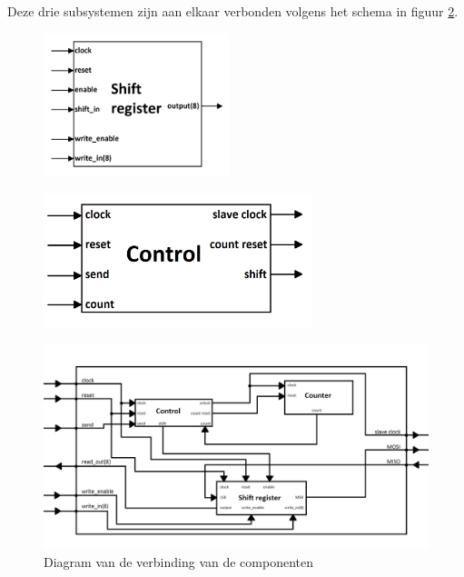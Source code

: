 \documentclass[oneside,dutch]{tudelft-report}
\begin{document}
Deze drie subsystemen zijn aan elkaar verbonden volgens het schema in figuur \ref{spi-system-diagram}.

\begin{figure}[H]
\centering
\begin{minipage}{.5\textwidth}
  \centering
  \includegraphics[width=5.4cm]{./shift_register_diagram}
  \label{shift-register-diagram}
\end{minipage}%
\begin{minipage}{.5\textwidth}
  \centering
  \includegraphics[width=7.8cm]{./control_diagram}
  \label{control-diagram}
\end{minipage}
\end{figure}

\begin{figure}[H]
\center
\includegraphics[width=11.4cm]{./spi_system_diagram}
\caption{Diagram van de verbinding van de componenten}
\label{spi-system-diagram}
\end{figure}

\newpage
\end{document}
